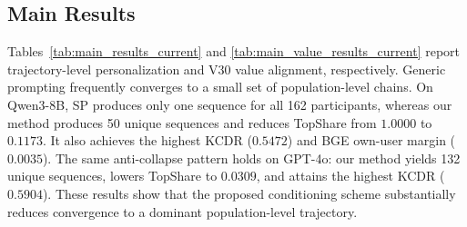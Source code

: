 \subsection{Main Results}
\label{sec:main_results}

Tables~\ref{tab:main_results_current} and
\ref{tab:main_value_results_current} report trajectory-level personalization
and V30 value alignment, respectively. Generic prompting frequently
converges to a small set of population-level chains. On Qwen3-8B, SP produces
only one sequence for all 162 participants, whereas our method produces 50
unique sequences and reduces TopShare from \(1.0000\) to \(0.1173\). It also
achieves the highest KCDR (\(0.5472\)) and BGE own-user margin (\(0.0035\)).
The same anti-collapse pattern holds on GPT-4o: our method yields 132 unique
sequences, lowers TopShare to \(0.0309\), and attains the highest KCDR
(\(0.5904\)). These results show that the proposed conditioning scheme
substantially reduces convergence to a dominant population-level trajectory.

